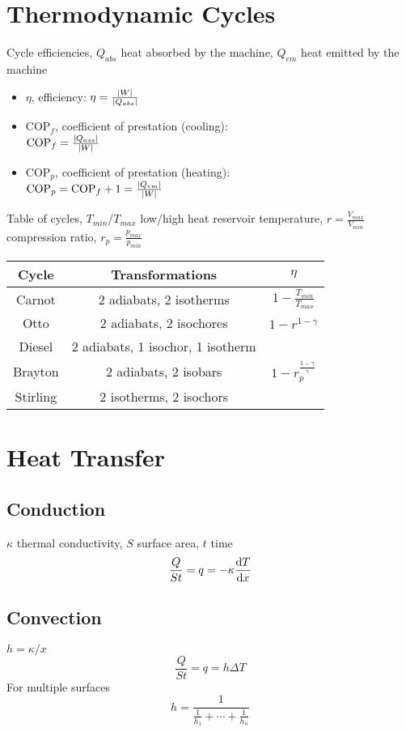 \documentclass{aa}
\begin{document}
\section{Thermodynamic Cycles}
Cycle efficiencies, $Q_{abs}$ heat absorbed by the machine, $Q_{em}$ heat emitted by the machine
\begin{itemize}
\item $\eta$, efficiency: $\eta=\frac{\abs{W}}{\abs{Q_{abs}}}$
\item $\mathrm{COP}_f$, coefficient of prestation (cooling):\\ $\mathrm{COP}_f=\frac{\abs{Q_{ass}}}{\abs{W}}$
\item $\mathrm{COP}_p$, coefficient of prestation (heating):\\ $\mathrm{COP}_p=\mathrm{COP}_f+1=\frac{\abs{Q_{em}}}{\abs{W}}$
\end{itemize}
Table of cycles, $T_{min}/T_{max}$ low/high heat reservoir temperature, $r=\frac{V_{max}}{V_{min}}$ compression ratio, $r_p=\frac{p_{max}}{p_{min}}$
\begin{table}[H]
	\centering
	\begin{tabular}{|c|c|c|}
		\hline
		Cycle&Transformations&$\eta$\\
		\hline
		Carnot&2 adiabats, 2 isotherms&$1-\frac{T_{min}}{T_{max}}$\\
		\hline
		Otto&2 adiabats, 2 isochores&$1-{r^{1-\gamma}}$\\
		\hline
		Diesel&2 adiabats, 1 isochor, 1 isotherm&\\
		\hline
		Brayton&2 adiabats, 2 isobars&$1-{r_p^{\frac{1-\gamma}{\gamma}}}$\\
		\hline
		Stirling&2 isotherms, 2 isochors&\\
		\hline
	\end{tabular}
	\label{tab:cycles}
\end{table}
\section{Heat Transfer}
\subsection{Conduction}
$\kappa$ thermal conductivity, $S$ surface area, $t$ time
\begin{equation}
	\frac{Q}{St}=q=-\kappa\dv{T}{x}
\end{equation}
\subsection{Convection}
$h=\kappa/x$
\begin{equation}
	\frac{Q}{St}=q=h\Delta T
\end{equation}
For multiple surfaces
\begin{equation}
	h=\frac{1}{\frac{1}{h_1}+\cdots+\frac{1}{h_n}}
\end{equation}
\end{document}
